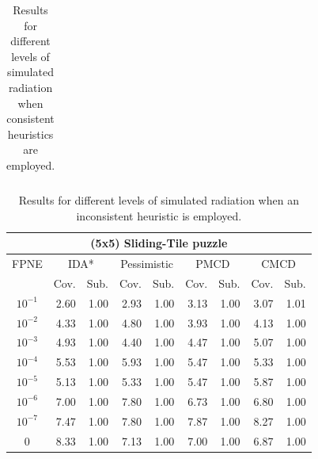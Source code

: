 \documentclass[letterpaper]{article}
\begin{document}
\begin{table}[t]
\begin{tabular}{| c | r  r | r  r | r  r | r  r |}
\end{tabular}
\caption{Results for different levels of simulated radiation when consistent heuristics are employed.}
\label{tab:results}
\end{table}


\begin{table}[t]
\centering
\setlength{\tabcolsep}{4.0 pt}
\begin{tabular}{| c | r  r | r  r | r  r | r  r |}
\hline
\multicolumn{9}{|c|}{\textbf{(5x5) Sliding-Tile puzzle}} \\
\hline
FPNE     & \multicolumn{2}{|c|}{IDA*}    & \multicolumn{2}{|c|}{Pessimistic}     & \multicolumn{2}{|c|}{PMCD}    & \multicolumn{2}{|c|}{CMCD}    \\
\hline
        & \multicolumn{1}{c}{Cov.} & \multicolumn{1}{c|}{Sub.}  & \multicolumn{1}{c}{Cov.} & \multicolumn{1}{c|}{Sub.}  & \multicolumn{1}{c}{Cov.} & \multicolumn{1}{c|}{Sub.}  & \multicolumn{1}{c}{Cov.} & \multicolumn{1}{c|}{Sub.}  \\
\hline
$10^{-1}$	 & 2.60	 & 1.00	 & 2.93	 & 1.00	 & 3.13	 & 1.00	 & 3.07	 & 1.01	\\
$10^{-2}$	 & 4.33	 & 1.00	 & 4.80	 & 1.00	 & 3.93	 & 1.00	 & 4.13	 & 1.00	\\
$10^{-3}$	 & 4.93	 & 1.00	 & 4.40	 & 1.00	 & 4.47	 & 1.00	 & 5.07	 & 1.00	\\
$10^{-4}$	 & 5.53	 & 1.00	 & 5.93	 & 1.00	 & 5.47	 & 1.00	 & 5.33	 & 1.00	\\
$10^{-5}$	 & 5.13	 & 1.00	 & 5.33	 & 1.00	 & 5.47	 & 1.00	 & 5.87	 & 1.00	\\
$10^{-6}$	 & 7.00	 & 1.00	 & 7.80	 & 1.00	 & 6.73	 & 1.00	 & 6.80	 & 1.00	\\
$10^{-7}$	 & 7.47	 & 1.00	 & 7.80	 & 1.00	 & 7.87	 & 1.00	 & 8.27	 & 1.00	\\
0 	 & 8.33	 & 1.00 	 & 7.13	 & 1.00 	 & 7.00	 & 1.00 	 & 6.87	 & 1.00 	\\
\hline
\end{tabular}
\caption{Results for different levels of simulated radiation when an inconsistent heuristic is employed.}
\label{tab:24puzzle}
\end{table}
\end{document}
